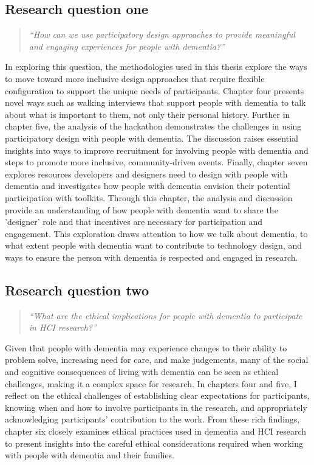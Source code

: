 \subsection{Research question one}
\label{RQ1}
\begin{quote}
\textit{``How can we use participatory design approaches to provide meaningful and engaging experiences for people with dementia?''}
\end{quote}
In exploring this question, the methodologies used in this thesis explore the ways to move toward more inclusive design approaches that require flexible configuration to support the unique needs of participants. Chapter four presents novel ways such as walking interviews that support people with dementia to talk about what is important to them, not only their personal history. Further in chapter five, the analysis of the hackathon demonstrates the challenges in using participatory design with people with dementia. The discussion raises essential insights into ways to improve recruitment for involving people with dementia and steps to promote more inclusive, community-driven events. Finally, chapter seven explores resources developers and designers need to design with people with dementia and investigates how people with dementia envision their potential participation with toolkits. Through this chapter, the analysis and discussion provide an understanding of how people with dementia want to share the 'designer' role and that incentives are necessary for participation and engagement. This exploration draws attention to how we talk about dementia, to what extent people with dementia want to contribute to technology design, and ways to ensure the person with dementia is respected and engaged in research.

\subsection{Research question two}
\label{RQ2}
\begin{quote}
\textit{``What are the ethical implications for people with dementia to participate in HCI research?''}
\end{quote}
Given that people with dementia may experience changes to their ability to problem solve, increasing need for care, and make judgements, many of the social and cognitive consequences of living with dementia can be seen as ethical challenges, making it a complex space for research. In chapters four and five, I reflect on the ethical challenges of establishing clear expectations for participants, knowing when and how to involve participants in the research, and appropriately acknowledging participants' contribution to the work. From these rich findings, chapter six closely examines ethical practices used in dementia and HCI research to present insights into the careful ethical considerations required when working with people with dementia and their families.

